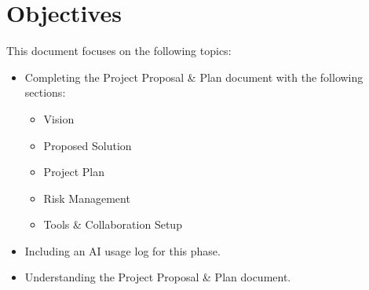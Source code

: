 \section{Objectives}

This document focuses on the following topics:
\begin{itemize}
  \item Completing the Project Proposal \& Plan document with the following sections:
  \begin{itemize}
    \item Vision
    \item Proposed Solution
    \item Project Plan
    \item Risk Management
    \item Tools \& Collaboration Setup
  \end{itemize}
  \item Including an AI usage log for this phase.
  \item Understanding the Project Proposal \& Plan document.
\end{itemize}